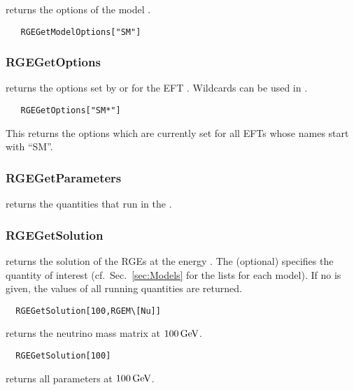 \documentclass[10pt,a4paper,twoside]{scrartcl}
\begin{document}
 returns the options of the model
.
 
  \begin{verbatim}
   RGEGetModelOptions["SM"]
 \end{verbatim}
 

\subsubsection{RGEGetOptions}

 returns the options set by
 or  for the EFT .
Wildcards can be used in .
 
  \begin{verbatim}
   RGEGetOptions["SM*"]
 \end{verbatim}
 This returns the options which are currently set for all EFTs whose
 names start with ``SM''.
 

\subsubsection{RGEGetParameters}

 returns the quantities that run
in the .
% 
% 

\subsubsection{RGEGetSolution}

\label{sec:RGEGetSolution}
returns the solution of the RGEs at the energy .
The  (optional) specifies the quantity
of interest (cf.\ Sec.~\ref{sec:Models} for the lists for each model).
If no  is given, the values of all running
quantities are returned.


\begin{verbatim}
  RGEGetSolution[100,RGEM\[Nu]]
\end{verbatim}
returns the neutrino mass matrix at $100\,\mathrm{GeV}$.
\begin{verbatim}
  RGEGetSolution[100]
\end{verbatim}
returns all parameters at $100\,\mathrm{GeV}$.
\end{document}

